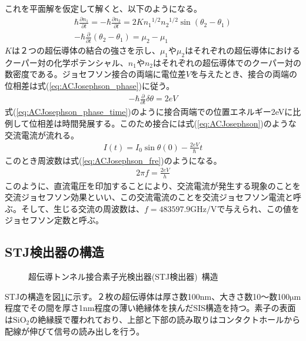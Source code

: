 		これを平面解を仮定して解くと、以下のようになる。
		\begin{eqnarray}
			\hbar \frac{\partial n_1}{\partial t} = - \hbar \frac{\partial n_2}{\partial t} = 2 K {n_1}^{1/2} {n_2}^{1/2} \sin (\theta_2 - \theta_1) \\
			- \hbar \frac{\partial}{\partial t} (\theta_2 - \theta_1) = \mu_2 - \mu_1
			\label{eq:ACJosephson_phase}
		\end{eqnarray}
		$K$は２つの超伝導体の結合の強さを示し、$\mu_1$や$\mu_2$はそれぞれの超伝導体におけるクーパー対の化学ポテンシャル、$n_1$や$n_2$はそれぞれの超伝導体でのクーパー対の数密度である。ジョセフソン接合の両端に電位差$V$を与えたとき、接合の両端の位相差は式(\ref{eq:ACJosephson_phase})に従う。
		\begin{eqnarray}
		- \hbar \frac{\partial}{\partial t} \delta \theta = 2eV
		\label{eq:ACJosephson_phase_time}
		\end{eqnarray}
		式(\ref{eq:ACJosephson_phase_time})のように接合両端での位置エネルギー2eVに比例して位相差は時間発展する。このため接合には式(\ref{eq:ACJosephson})のような交流電流が流れる。
		\begin{eqnarray}
			I(t) = I_{0} \sin { \theta (0) - \frac{2eV}{\hbar} t }
			\label{eq:ACJosephson}
		\end{eqnarray}
		このとき周波数は式(\ref{eq:ACJosephson_fre})のようになる。
		\begin{eqnarray}
			2 \pi f = \frac{2eV}{h}
			\label{eq:ACJosephson_fre}
		\end{eqnarray}
		このように、直流電圧を印加することにより、交流電流が発生する現象のことを交流ジョセフソン効果といい、この交流電流のことを交流ジョセフソン電流と呼ぶ。そして、生じる交流の周波数は、$f = 483597.9 \mathrm{GHz/V}$で与えられ、この値をジョセフソン定数と呼ぶ。
	
	\subsection{STJ検出器の構造}
		\begin{figure}[htbp]
  			\begin{center}
    				\caption{超伝導トンネル接合素子光検出器(STJ検出器)\ 構造}
    				\label{fig:STJ_structure}
  			\end{center}
		\end{figure}
		STJの構造を図\ref{fig:STJ_structure}に示す。２枚の超伝導体は厚さ数100nm、大きさ数10〜数100$\mathrm{\mu m}$程度でその間を厚さ1nm程度の薄い絶縁体を挟んだSIS構造を持つ。素子の表面は$\mathrm{SiO_2}$の絶縁膜で覆われており、上部と下部の読み取りはコンタクトホールから配線が伸びて信号の読み出しを行う。
	
